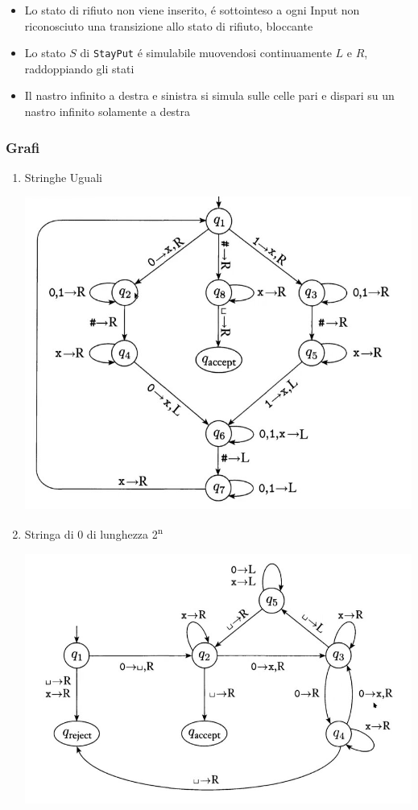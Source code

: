 \documentclass[11pt]{article}
\begin{document}
\begin{itemize}
\item Lo stato di rifiuto non viene inserito, é sottointeso a ogni Input non riconosciuto una transizione allo stato di rifiuto, bloccante
\item Lo stato \(S\) di \texttt{StayPut} é simulabile muovendosi continuamente \(L\) e \(R\), raddoppiando gli stati
\item Il nastro infinito a destra e sinistra si simula sulle celle pari e dispari su un nastro infinito solamente a destra
\end{itemize}

\subsubsection{Grafi}
\label{sec:org2d8c63f}
\begin{enumerate}
\item Stringhe Uguali
\label{sec:org742f417}
\begin{center}
\includegraphics[width=.9\linewidth]{../media/img/grafoEs1.jpg}
\end{center}
\item Stringa di 0 di lunghezza 2\textsuperscript{n}
\label{sec:org1e058d2}
\begin{center}
\includegraphics[width=.9\linewidth]{../media/img/graphPowerOfTwoLength.jpg}
\end{center}
\end{enumerate}
\end{document}
